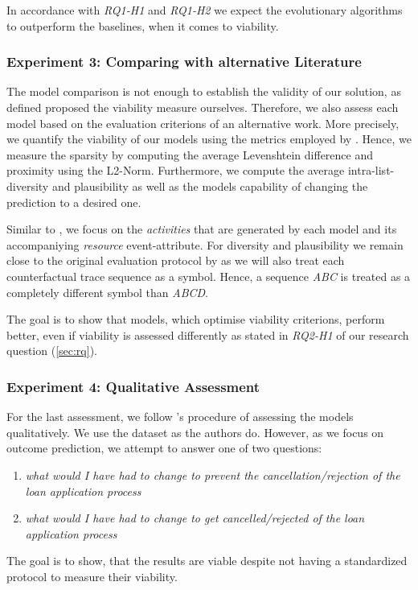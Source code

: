 \documentclass[./../../paper.tex]{subfiles}
\begin{document}
\noindent In accordance with \emph{RQ1-H1} and \emph{RQ1-H2} we expect the evolutionary algorithms to outperform the baselines, when it comes to viability.

\subsubsection{Experiment 3: Comparing with alternative Literature}
The model comparison is not enough to establish the validity of our solution, as defined proposed the viability measure ourselves. Therefore, we also assess each model based on the evaluation criterions of an alternative work. More precisely, we quantify the viability of our models using the metrics employed by \citeauthor{hsieh_DiCE4ELInterpretingProcess_2021}. Hence, we measure the sparsity by computing the average Levenshtein difference and proximity using the L2-Norm. Furthermore, we compute the average intra-list-diversity and plausibility as well as the models capability of changing the prediction to a desired one. 

Similar to \citeauthor{hsieh_DiCE4ELInterpretingProcess_2021}, we focus on the \emph{activities} that are generated by each model and its accompaniying \emph{resource} event-attribute. For diversity and plausibility we remain close to the original evaluation protocol by \citeauthor{hsieh_DiCE4ELInterpretingProcess_2021} as we will also treat each counterfactual trace sequence as a symbol. Hence, a sequence \emph{ABC} is treated as a completely different symbol than \emph{ABCD}.

The goal is to show that models, which optimise viability criterions, perform better, even if viability is assessed differently as stated in \emph{RQ2-H1} of our research question (\autoref{sec:rq}). 

\subsubsection{Experiment 4: Qualitative Assessment}
For the last assessment, we follow \citeauthor{hsieh_DiCE4ELInterpretingProcess_2021}'s procedure of assessing the models qualitatively. We use the dataset as the authors do. However, as we focus on outcome prediction, we attempt to answer one of two questions: 

\begin{enumerate}
    \item \emph{what would I have had to change to prevent the cancellation/rejection of the loan application process}
    \item \emph{what would I have had to change to get cancelled/rejected of the loan application process}
\end{enumerate}

The goal is to show, that the results are viable despite not having a standardized protocol to measure their viability.
\end{document}
